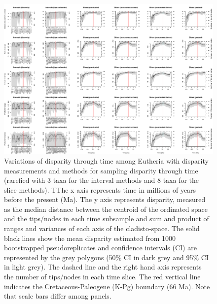 \begin{landscape}
\begin{figure}[!htbp]
\centering
    \includegraphics[width=\textwidth,height=\textheight,keepaspectratio]{Supplementaries/Figures/STD/Eutheria_all_methods_rarefied.pdf}
\caption[Comparison of all the disparity metrics and all the time series methods for Eutheria (rarefied)]{Variations of disparity through time among Eutheria with disparity measurements and methods for sampling disparity through time (rarefied with 3 taxa for the interval methods and 8 taxa for the slice methods). TThe x axis represents time in millions of years before the present (Ma). The y axis represents disparity, measured as the median distance between the centroid of the ordinated space and the tips/nodes in each time subsample and sum and product of ranges and variances of each axis of the cladisto-space. The solid black lines show the mean disparity estimated from 1000 bootstrapped pseudoreplicates and confidence intervals (CI) are represented by the grey polygons (50\% CI in dark grey and 95\% CI in light grey). The dashed line and the right hand axis represents the number of tips/nodes in each time slice. The red vertical line indicates the Cretaceous-Paleogene (K-Pg) boundary (66 Ma). Note that scale bars differ among panels.}
\label{Supp_disparity_all_Eutheria_rarefied}

\end{figure}
\end{landscape}